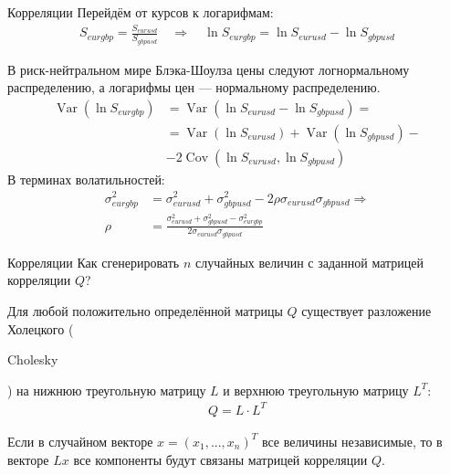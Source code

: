 \documentclass{beamer}
\newcommand{\en}[1]{\begin{otherlanguage}{english}#1\end{otherlanguage}}
\begin{document}
\newcommand{\Var}{\operatorname{Var}}
\newcommand{\Cov}{\operatorname{Cov}}

\begin{frame}{Корреляции}
\justify
Перейдём от курсов к логарифмам:
\begin{align*}
S_{eurgbp} = \frac{S_{eurusd}}{S_{gbpusd}} \quad \Rightarrow \quad \ln S_{eurgbp} = \ln S_{eurusd} - \ln S_{gbpusd} 
\end{align*}

\justify
В риск-нейтральном мире Блэка-Шоулза цены следуют логнормальному распределению, а логарифмы цен --- нормальному распределению.
\begin{align*}
\Var(\ln S_{eurgbp}) &= \Var(\ln S_{eurusd} - \ln S_{gbpusd}) = \\
&= \Var(\ln S_{eurusd}) + \Var(\ln S_{gbpusd}) - \\
&- 2\Cov(\ln S_{eurusd}, \ln S_{gbpusd})
\end{align*}
В терминах волатильностей:
\begin{align*}
\sigma_{eurgbp}^2 &= \sigma_{eurusd}^2 + \sigma_{gbpusd}^2 - 2\rho\sigma_{eurusd}\sigma_{gbpusd} \Rightarrow \\
\rho &= \frac{\sigma_{eurusd}^2 + \sigma_{gbpusd}^2 - \sigma_{eurgbp}^2}{2\sigma_{eurusd}\sigma_{gbpusd}}
\end{align*}
\end{frame}



\begin{frame}{Корреляции}
\justify
Как сгенерировать $n$ случайных величин с заданной матрицей корреляции $Q$?

\justify
Для любой положительно определённой матрицы $Q$ существует разложение Холецкого (\en{Cholesky}) на нижнюю треугольную матрицу $L$ и верхнюю треугольную матрицу $L^T$:
\begin{align*}
Q = L \cdot L^T
\end{align*}

\justify
Если в случайном векторе $x=(x_1,...,x_n)^T$ все величины независимые, то в векторе $Lx$ все компоненты будут связаны матрицей корреляции $Q$.
\end{frame}
\end{document}
